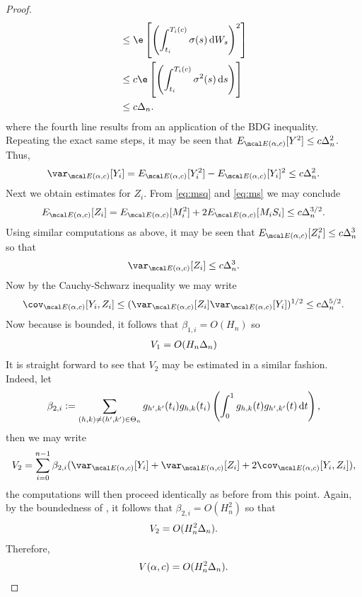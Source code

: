 \begin{appendices}
\begin{proof}
\begin{align}
&\le\e\left[ \left(\int^{T_i(c)}_{t_i} \sigma(s) \D W_s\right)^2\right]\notag\\
&\le c \e\left[ \left(\int^{T_i(c)}_{t_i} \sigma^2(s) \D s\right)\right]\notag\\
&\le c\Delta_n.
  \label{}
\end{align}
where the fourth line results from an application of the BDG inequality.  Repeating the exact same steps, it may be seen that $\eind[Y^2] \le c \Delta_n^2$. Thus,
\begin{align}
  \varind[Y_i] = \eind[Y_i^2] - \eind[Y_i]^2 \le c \Delta_n^2.
\end{align}
Next we obtain estimates for $Z_i$. From \eqref{eq:msq} and \eqref{eq:ms} we may conclude
\begin{align}
  \eind[Z_i] = \eind[M_i^2] + 2 \eind[M_i S_i] \le c \Delta_n^{3/2}. \notag
  \label{}
\end{align}
Using similar computations as above, it may be seen that $\eind[Z_i^2] \le c\Delta^3_n$ so that 
\begin{align}
  \varind[Z_i] \le c \Delta_n^3.\notag
  \label{}
\end{align}
Now by  the Cauchy-Schwarz inequality  we may write
\begin{align}
    \covind[Y_i, Z_i] \le (\varind[Z_i] \varind[Y_i])^{1/2} \le c \Delta_n^{5/2}. \notag
\end{align}
Now because \ghk is bounded, it follows that $\beta_{1,i} = O(H_n)$ so  
\begin{align}
  V_{1} = O(H_n\Delta_n)\notag
  \label{}
\end{align}
It is  straight forward to see  that $V_{2}$ may be estimated in a similar fashion. Indeed, let
\begin{align}
  \beta_{2,i} := \sum_{ (h,k) \ne (h',k') \in \Theta_n} g_{h',k'}(t_i)g_{h,k}(t_i)\left( \int_0^1 g_{h,k}(t) g_{h',k'}(t)\D t\right),\notag
  \label{}
\end{align}
then we may write
\begin{align}
  V_{2} = \sum_{i = 0}^{n-1} \beta_{2,i} (\varind[Y_i] + \varind[Z_i] + 2 \covind[Y_i,Z_i]), \notag
  \label{}
\end{align}
the computations will then proceed identically as before from this point. Again, by the boundedness of \ghk, it follows that   $ \beta_{2,i} = O(H_n^2)$ so that
\begin{align}
  V_{2} = O(H^2_n\Delta_n).\notag
  \label{}
\end{align}
Therefore,
\begin{align}
  V(\alpha,c)  = O(H^2_n\Delta_n).\notag
  \label{}
\end{align}
\end{proof}
\end{appendices}
